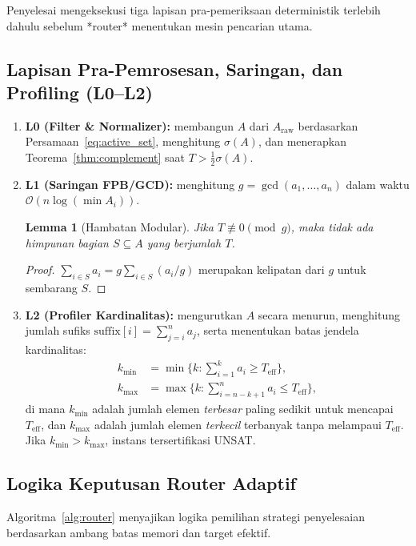 \documentclass[journal,onecolumn,11pt]{IEEEtran}
\newtheorem{lemma}{Lemma}
\begin{document}
Penyelesai mengeksekusi tiga lapisan pra-pemeriksaan deterministik terlebih dahulu sebelum *router* menentukan mesin pencarian utama.

\subsection{Lapisan Pra-Pemrosesan, Saringan, dan Profiling (L0--L2)}
\begin{enumerate}
    \item \textbf{L0 (Filter \& Normalizer):} membangun $A$ dari $A_{\text{raw}}$ berdasarkan Persamaan~\eqref{eq:active_set}, menghitung $\sigma(A)$, dan menerapkan Teorema~\ref{thm:complement} saat $T > \tfrac12\sigma(A)$.
    \item \textbf{L1 (Saringan FPB/GCD):} menghitung $g=\gcd(a_1,\dots,a_n)$ dalam waktu $\mathcal{O}(n\log(\min A_i))$.
    \begin{lemma}[Hambatan Modular]
    Jika $T \not\equiv 0 \pmod g$, maka tidak ada himpunan bagian $S \subseteq A$ yang berjumlah $T$.
    \end{lemma}
    \begin{proof}
    $\sum_{i\in S} a_i = g\sum_{i\in S}(a_i/g)$ merupakan kelipatan dari $g$ untuk sembarang $S$.
    \end{proof}
    \item \textbf{L2 (Profiler Kardinalitas):} mengurutkan $A$ secara menurun, menghitung jumlah sufiks $\text{suffix}[i]=\sum_{j=i}^{n} a_j$, serta menentukan batas jendela kardinalitas:
    \begin{align}
        k_{\min} &= \min\Big\{k : \textstyle\sum_{i=1}^k a_i \ge T_{\text{eff}}\Big\}, \\
        k_{\max} &= \max\Big\{k : \textstyle\sum_{i=n-k+1}^n a_i \le T_{\text{eff}}\Big\},
    \end{align}
    di mana $k_{\min}$ adalah jumlah elemen \emph{terbesar} paling sedikit untuk mencapai $T_{\text{eff}}$, dan $k_{\max}$ adalah jumlah elemen \emph{terkecil} terbanyak tanpa melampaui $T_{\text{eff}}$. Jika $k_{\min}>k_{\max}$, instans tersertifikasi UNSAT.
\end{enumerate}

\subsection{Logika Keputusan Router Adaptif}
Algoritma~\ref{alg:router} menyajikan logika pemilihan strategi penyelesaian berdasarkan ambang batas memori dan target efektif.
\end{document}
